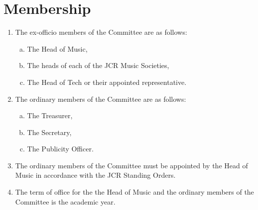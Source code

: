 \documentclass[12pt]{article}
\begin{document}
\section{Membership}
\begin{enumerate}
    \item The ex-officio members of the Committee are as follows:
    \begin{enumerate}[(a)]
        \item The Head of Music,
        \item The heads of each of the JCR Music Societies,
        \item The Head of Tech or their appointed representative.
    \end{enumerate}
    \item The ordinary members of the Committee are as follows:
    \begin{enumerate}[(a)]
        \item The Treasurer,
        \item The Secretary,
        \item The Publicity Officer.
    \end{enumerate}
    \item The ordinary members of the Committee must be appointed by the Head of Music in accordance with the JCR Standing Orders.
    \item The term of office for the the Head of Music and the ordinary members of the Committee is the academic year.
\end{enumerate}
\end{document}
